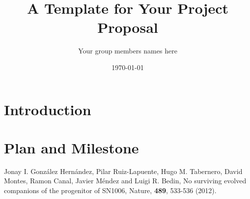 \documentclass[dvips,12pt]{article}
\begin{document}

\title{A Template for Your Project Proposal}
\author{Your group members names here}
\date{\today}



\maketitle


\section{Introduction}

\section{Plan and Milestone}

 
\begin{thebibliography}{99}

 Jonay I. Gonz\'{a}lez Hern\'{a}ndez, 
Pilar Ruiz-Lapuente,	
Hugo M. Tabernero,	
David Montes,	
Ramon Canal,	
Javier M\'{e}ndez	
and Luigi R. Bedin,
{No surviving evolved companions of the progenitor of SN1006},
Nature, {\bf 489}, 533-536 (2012).

\end{thebibliography}
\end{document}
